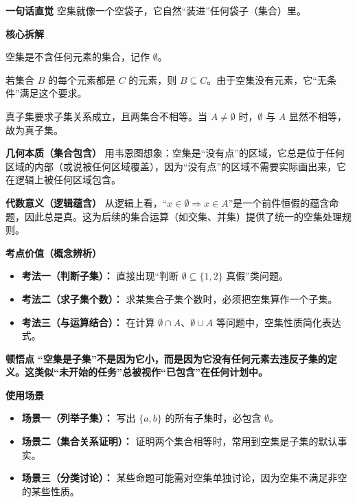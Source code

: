 \begin{explanationbox}
	\textbf{\textcolor{CExplanation}{一句话直觉}}
	空集就像一个空袋子，它自然“装进”任何袋子（集合）里。

	\medskip
	\textbf{\textcolor{CExplanation}{核心拆解}}
	\begin{description}[style=nextline, leftmargin=2.8em, labelsep=0.5em, itemsep=0.45em]
		\item[\textbf{要点一（空集定义）：}]
			空集是不含任何元素的集合，记作 $\emptyset$。
		\item[\textbf{要点二（子集定义）：}]
			若集合 $B$ 的每个元素都是 $C$ 的元素，则 $B \subseteq C$。由于空集没有元素，它“无条件”满足这个要求。
		\item[\textbf{要点三（真子集条件）：}]
			真子集要求子集关系成立，且两集合不相等。当 $A \neq \emptyset$ 时，$\emptyset$ 与 $A$ 显然不相等，故为真子集。
	\end{description}

	\medskip
	\textbf{\textcolor{CExplanation}{几何本质（集合包含）}}
	用韦恩图想象：空集是“没有点”的区域，它总是位于任何区域的内部（或说被任何区域覆盖），因为“没有点”的区域不需要实际画出来，它在逻辑上被任何区域包含。

	\medskip
	\textbf{\textcolor{CExplanation}{代数意义（逻辑蕴含）}}
	从逻辑上看，“$x \in \emptyset \Rightarrow x \in A$”是一个前件恒假的蕴含命题，因此总是真。这为后续的集合运算（如交集、并集）提供了统一的空集处理规则。

	\medskip
	\textbf{\textcolor{CExplanation}{考点价值（概念辨析）}}
	\begin{itemize}[leftmargin=*, itemsep=0.5em, topsep=0.4em]
		\item \textbf{考法一（判断子集）：} 直接出现“判断 $\emptyset \subseteq \{1,2\}$ 真假”类问题。
		\item \textbf{考法二（求子集个数）：} 求某集合子集个数时，必须把空集算作一个子集。
		\item \textbf{考法三（与运算结合）：} 在计算 $\emptyset \cap A$、$\emptyset \cup A$ 等问题中，空集性质简化表达式。
	\end{itemize}

	\medskip
	\textbf{\textcolor{CExplanation}{顿悟点}}
	\textbf{“空集是子集”不是因为它小，而是因为它没有任何元素去违反子集的定义。这类似“未开始的任务”总被视作“已包含”在任何计划中。}

	\medskip
	\textbf{\textcolor{CExplanation}{使用场景}}
	\begin{itemize}[leftmargin=*, itemsep=0.5em, topsep=0.4em]
		\item \textbf{场景一（列举子集）：} 写出 $\{a,b\}$ 的所有子集时，必包含 $\emptyset$。
		\item \textbf{场景二（集合关系证明）：} 证明两个集合相等时，常用到空集是子集的默认事实。
		\item \textbf{场景三（分类讨论）：} 某些命题可能需对空集单独讨论，因为空集不满足非空的某些性质。
	\end{itemize}

\end{explanationbox}
